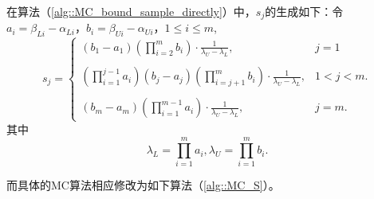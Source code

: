 在算法（\ref{alg::MC_bound_sample_directly}）中，$s_j$的生成如下：令$a_i = \beta_{Li} - \alpha_{Li}$，$b_i = \beta_{Ui} - \alpha_{Ui}$，$1 \leq i \leq m$,
\begin{equation}
  s_j = \left\{
  \begin{array}{ll}
    \displaystyle (b_1 - a_1)\left(\prod_{i = 2}^m b_i\right) \cdot \frac{1}
    {\lambda_U - \lambda_L}, & j = 1\\\\
    \displaystyle \left(\prod_{i = 1}^{j - 1} a_i\right)(b_j - a_j)
    \left(\prod_{i = j + 1}^m b_i\right) \cdot \frac{1}{\lambda_U - \lambda_L}, &
    1 < j < m.\\\\
    \displaystyle (b_m - a_m)\left(\prod_{i = 1}^{m - 1}a_i\right) \cdot \frac{1}{\lambda_U - \lambda_L}, & j = m.
  \end{array}
  \right.
\end{equation}
其中
$$
\lambda_L = \prod_{i = 1}^m a_i, \lambda_U = \prod_{i = 1}^m b_i.
$$


而具体的MC算法相应修改为如下算法（\ref{alg::MC_S}）。

